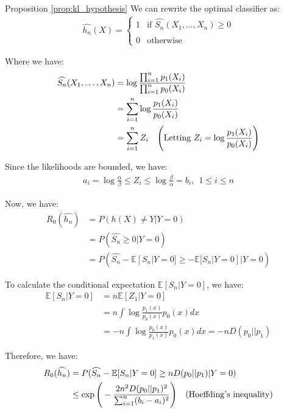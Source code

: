 \begin{proof*}{Proposition \ref{prop:kl_hypothesis}}
    We can rewrite the optimal classifier as:
    \begin{align*}
        \widehat{h_n}(X) = \begin{cases}
            1 &\text{if } \widehat{S_n}(X_1, \dots, X_n) \ge 0
            \\ \\
            0 &\text{otherwise}
        \end{cases} 
    \end{align*}

    \noindent Where we have:
    \begin{align*}
        \widehat{S_n}(X_1, \dots, X_n) &= \log \frac{\prod_{i=1}^n p_1(X_i)}{\prod_{i=1}^n p_0(X_i)} \\
        &= \sum_{i=1}^n \log\frac{p_1(X_i)}{p_0(X_i)} \\
        &= \sum_{i=1}^n Z_i \ \ \ \Bigg( \text{Letting } Z_i = \log\frac{p_1(X_i)}{p_0(X_i)} \Bigg)
    \end{align*}

    \noindent Since the likelihoods are bounded, we have:
    \begin{align*}
        a_i = \log\frac{\alpha}{\beta} \le Z_i \le \log\frac{\beta}{\alpha} = b_i, \ \ 1 \le i \le n
    \end{align*}

    \noindent Now, we have:
    \begin{align*}
        R_0(\widehat{h_n}) 
            &= P(h(X) \ne Y | Y=0) \\
            &= P(\widehat{S_n} \ge 0 | Y = 0) \\
            &= P(\widehat{S_n} - \mathbb{E}[S_n | Y = 0] \ge - \mathbb{E}[S_n | Y = 0] | Y=0)
    \end{align*}

    \noindent To calculate the conditional expectation $\mathbb{E}[S_n | Y = 0]$, we have:
    \begin{align*}
        \mathbb{E}[S_n | Y = 0] &= n\mathbb{E}[Z_1|Y=0] \\
            &= n\int \log\frac{p_1(x)}{p_0(x)}p_0(x)dx \\
            &= -n\int \log\frac{p_0(x)}{p_1(x)}p_0(x)dx = -nD(p_0||p_1)
    \end{align*}

    \noindent Therefore, we have:
    \begin{align*}
        R_0(\widehat{h_n}) 
            &= P(\widehat{S_n} - \mathbb{E}[S_n | Y = 0] \ge nD(p_0||p_1) | Y=0) \\
            &\le \exp\Bigg( 
                -\frac{2n^2D(p_0||p_1)^2}{\sum_{i=1}^n (b_i - a_i)^2}
             \Bigg) \ \ \ (\text{Hoeffding's inequality})
    \end{align*}


\end{proof*}
